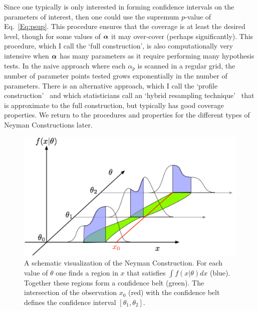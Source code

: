 \documentclass{cernrep}
\def\vec#1{\ifmmode
\mathchoice{\mbox{\boldmath$\displaystyle\bf#1$}}
{\mbox{\boldmath$\textstyle\bf#1$}}
{\mbox{\boldmath$\scriptstyle\bf#1$}}
{\mbox{\boldmath$\scriptscriptstyle\bf#1$}}\else
{\mbox{\boldmath$\bf#1$}}\fi}
\begin{document}
Since one typically is only interested in forming confidence intervals on the parameters of interest, then one could use the supremum $p$-value of Eq.~\ref{Eq:psup}.  This procedure ensures that the coverage is at least the desired level, though for some values of $\vec\alpha$ it may over-cover (perhaps significantly).  This procedure, which I call the `full construction',  is also computationally very intensive when $\vec\alpha$ has many parameters as it require performing many hypothesis tests.  In the naive approach where each $\alpha_p$ is scanned in a regular grid, the number of parameter points tested grows exponentially in the number of parameters.  There is an alternative approach, which I call the `profile construction'~\cite{Feldman,Cranmer:2005hi}
 and which statisticians call an `hybrid resampling technique'~ \cite{Hybrid,Bodhi} that is approximate to the full construction, but typically has good coverage properties.  We return to the procedures and properties for the different types of Neyman Constructions later.

\begin{figure}[htbp]
\begin{center}
\includegraphics[width=.9\textwidth]{NC_schematic_obs.pdf}
\caption{A schematic visualization of the Neyman Construction.  For each value of $\theta$ one finds a region in $x$ that satisfies $\int f(x|\theta) dx$ (blue).  Together these regions form a confidence belt (green).  The intersection of the observation $x_0$ (red) with the confidence belt defines the confidence interval $[\theta_1,\theta_2]$.}
\label{fig:NC_schematic}
\end{center}
\end{figure}
\end{document}
